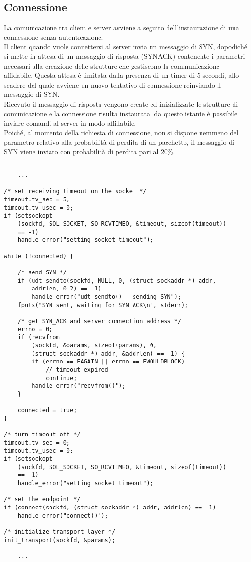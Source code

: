 \subsection{Connessione}
La comunicazione tra client e server avviene a seguito dell'instaurazione di una connessione senza autenticazione.\\
Il client quando vuole connettersi al server invia un messaggio di SYN, dopodiché si mette in attesa di un messaggio di risposta (SYNACK) contenente i parametri necessari alla creazione delle strutture che gestiscono la communicazione affidabile. Questa attesa è limitata dalla presenza di un timer di 5 secondi, allo scadere del quale avviene un nuovo tentativo di connessione reinviando il messaggio di SYN.\\
Ricevuto il messaggio di risposta vengono create ed inizializzate le strutture di comunicazione e la connessione risulta instaurata, da questo istante è possibile inviare comandi al server in modo affidabile.\\
Poiché, al momento della richiesta di connessione, non si dispone nemmeno del parametro relativo alla probabilità di perdita di un pacchetto, il messaggio di SYN viene inviato con probabilità di perdita pari al 20\%.

\begin{lstlisting}[title=client: instaurazione della connessione]

	...

/* set receiving timeout on the socket */
timeout.tv_sec = 5;
timeout.tv_usec = 0;
if (setsockopt
	(sockfd, SOL_SOCKET, SO_RCVTIMEO, &timeout, sizeof(timeout))
	== -1)
	handle_error("setting socket timeout");

while (!connected) {

	/* send SYN */
	if (udt_sendto(sockfd, NULL, 0, (struct sockaddr *) addr, 
		addrlen, 0.2) == -1)
		handle_error("udt_sendto() - sending SYN");
	fputs("SYN sent, waiting for SYN ACK\n", stderr);

	/* get SYN_ACK and server connection address */
	errno = 0;
	if (recvfrom
		(sockfd, &params, sizeof(params), 0,
		(struct sockaddr *) addr, &addrlen) == -1) {
		if (errno == EAGAIN || errno == EWOULDBLOCK)
			// timeout expired
			continue;
		handle_error("recvfrom()");
	}

	connected = true;
}

/* turn timeout off */
timeout.tv_sec = 0;
timeout.tv_usec = 0;
if (setsockopt
	(sockfd, SOL_SOCKET, SO_RCVTIMEO, &timeout, sizeof(timeout)) 
	== -1)
	handle_error("setting socket timeout");

/* set the endpoint */
if (connect(sockfd, (struct sockaddr *) addr, addrlen) == -1)
	handle_error("connect()");

/* initialize transport layer */
init_transport(sockfd, &params);

	...

\end{lstlisting}


